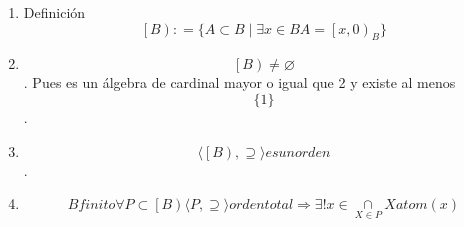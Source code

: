 \begin{enumerate}
\begin{enumerate}
\begin{enumerate}
      \[\mathit{Atom}{{(B_{2})} = \mathit{Hatom}}{{(B_{2})} = \varnothing}\]
    \item
      Definición
      \[\left\lbrack B \right){: = {\{{{A \subset B} \mid \exists{x \in B}{A = \left\lbrack {x,0} \right)_{B}}}\}}}\]
    \item
      \[\left\lbrack B \right) \neq \varnothing\]. Pues es un álgebra de
      cardinal mayor o igual que 2 y existe al menos \[\{ 1\}\].
    \item
      \[{\langle{\left\lbrack B \right), \supseteq}\rangle}\mathit{es}\mathit{un}\mathit{orden}\].
    \item
      \[B\mathit{finito}\forall{P \subset \left\lbrack B \right)}{\langle{P, \supseteq}\rangle}\mathit{orden}\mathit{total}\Rightarrow\exists!{x \in \underset{X \in P}{\cap}}X\mathit{atom}(x)\]


\end{enumerate}
\end{enumerate}
\end{enumerate}

